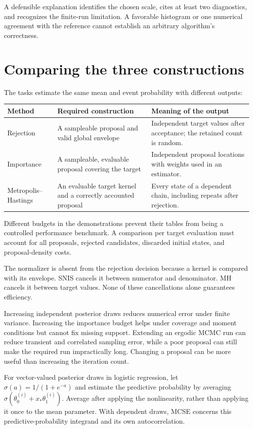 \documentclass[11pt,a4paper]{article}
\begin{document}
A defensible explanation identifies the chosen scale, cites at least two
diagnostics, and recognizes the finite-run limitation. A favorable histogram
or one numerical agreement with the reference cannot establish an arbitrary
algorithm's correctness.

\section{Comparing the three constructions}
The tasks estimate the same mean and event probability with different outputs:
\begin{center}
\begin{tabular}{@{}p{25mm}p{63mm}p{63mm}@{}}
\toprule
Method & Required construction & Meaning of the output \\
\midrule
Rejection & A sampleable proposal and valid global envelope & Independent
target values after acceptance; the retained count is random. \\
Importance & A sampleable, evaluable proposal covering the target & Independent
proposal locations with weights used in an estimator. \\
Metropolis--Hastings & An evaluable target kernel and a correctly accounted
proposal & Every state of a dependent chain, including repeats after rejection. \\
\bottomrule
\end{tabular}
\end{center}
Different budgets in the demonstrations prevent their tables from being a
controlled performance benchmark. A comparison per target evaluation must
account for all proposals, rejected candidates, discarded initial states, and
proposal-density costs.

The normalizer is absent from the rejection decision because a kernel is
compared with its envelope. SNIS cancels it between numerator and denominator.
MH cancels it between target values. None of these cancellations alone
guarantees efficiency.

Increasing independent posterior draws reduces numerical error under finite
variance. Increasing the importance budget helps under coverage and moment
conditions but cannot fix missing support. Extending an ergodic MCMC run
can reduce transient and correlated sampling error, while a poor proposal can
still make the required run impractically long. Changing a proposal can be
more useful than increasing the iteration count.

For vector-valued posterior draws in logistic regression, let
$\sigma(a)=1/(1+e^{-a})$ and estimate the predictive probability by averaging
$\sigma(\theta_0^{(i)}+x_*\theta_1^{(i)})$. Average after applying the
nonlinearity, rather than applying it once to the mean parameter. With
dependent draws, MCSE concerns this predictive-probability integrand and its
own autocorrelation.
\end{document}
